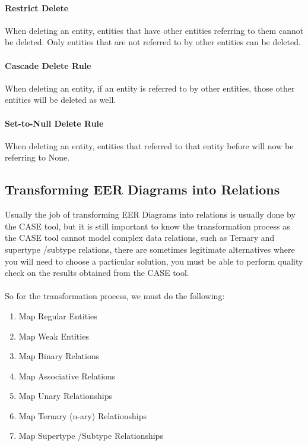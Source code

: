 \documentclass[12pt]{article}
\begin{document}
\paragraph{Restrict Delete} When deleting an entity, entities that have other entities referring to them cannot be deleted. Only entities that are not referred to by other entities can be deleted.

\paragraph{Cascade Delete Rule} When deleting an entity, if an entity is referred to by other entities, those other entities will be deleted as well.

\paragraph{Set-to-Null Delete Rule} When deleting an entity, entities that referred to that entity before will now be referring to None.

\subsection{Transforming EER Diagrams into Relations}

Usually the job of transforming EER Diagrams into relations is usually done by the CASE tool, but it is still important to know the transformation process as the CASE tool cannot model complex data relations, such as Ternary and supertype \slash  subtype relations, there are sometimes legitimate alternatives where you will need to choose a particular solution, you must be able to perform quality check on the results obtained from the CASE tool.\\
\\
So for the transformation process, we must do the following:
\begin{enumerate}
	\item{Map Regular Entities}
	\item{Map Weak Entities}
	\item{Map Binary Relations}
	\item{Map Associative Relations}
	\item{Map Unary Relationships}
	\item{Map Ternary (n-ary) Relationships}
	\item{Map Supertype \slash  Subtype Relationships}
\end{enumerate}
\end{document}
